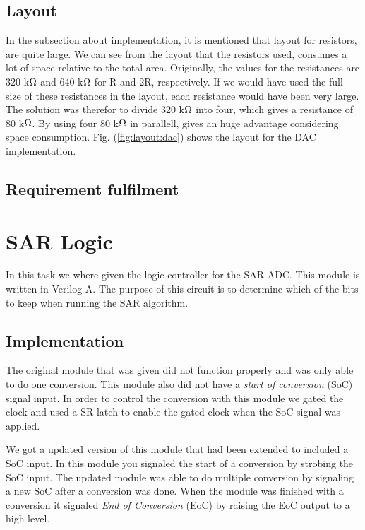 \documentclass[english, 12pt, a4paper]{ifimaster}
\begin{document}
\subsection{Layout}
In the subsection about implementation, it is mentioned that layout for resistors, are quite 
large. We can see from the layout that the resistors used, consumes a lot of space relative to the total area. Originally, the values for the resistances are
320 k\(\ohm\) and 640 k\(\ohm\) for R and 2R, respectively. If we would have used the full size of these resistances in the layout, each resistance would have been
very large. The solution was therefor to divide 320 k\(\ohm\) into four, which gives a resistance of 80 k\(\ohm\). By using four 80 k\(\ohm\) in parallell, gives an huge
advantage considering space consumption. Fig. (\ref{fig:layout:dac}) shows the layout for the DAC implementation.


\subsection{Requirement fulfilment}


\section{SAR Logic}
In this task we where given the logic controller for the SAR ADC. This module is written in Verilog-A. 
The purpose of this circuit is to determine which of the bits to keep when running the SAR algorithm.

\subsection{Implementation}
The original module that was given did not function properly and was only able to do one conversion. This module also did not have a \textit{start of conversion} (SoC) signal input.
In order to control the conversion with this module we gated the clock and used a SR-latch to enable the gated clock when the SoC signal was applied.

We got a updated version of this module that had been extended to included a SoC input. In this module you signaled the start of a conversion by strobing the SoC input.
The updated module was able to do multiple conversion by signaling a new SoC after a conversion was done. 
When the module was finished with a conversion it signaled \textit{End of Conversion} (EoC) by raising the EoC output to a high level. 
\end{document}
